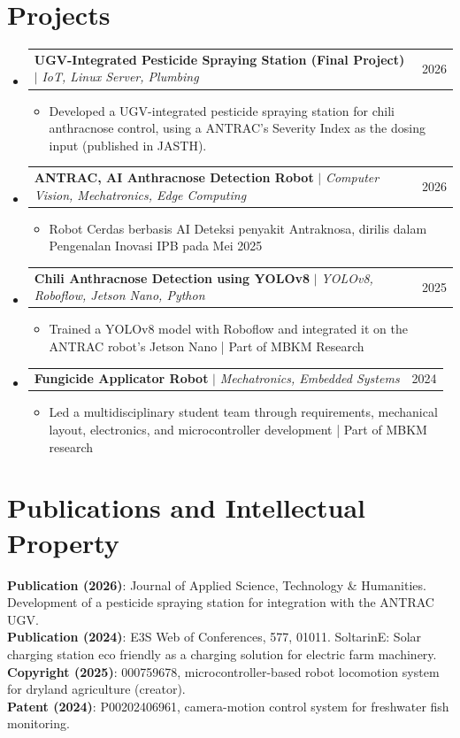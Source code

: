 \documentclass[letterpaper,11pt]{article}
\makeatletter
\newcommand{\resumeProjectHeading}[2]{
    \item
    \begin{tabular*}{0.97\textwidth}{l@{\extracolsep{\fill}}r}
      \small#1 & #2 \\
    \end{tabular*}\vspace{-7pt}
}
\newcommand{\resumeIntro}[1]{\item[]\small{#1 \vspace{-2pt}}}
\newcommand{\resumeSubHeadingListStart}{\begin{itemize}[leftmargin=0.15in, label={}]}
\newcommand{\resumeSubHeadingListEnd}{\end{itemize}}
\newcommand{\resumeItemListStart}{\begin{itemize}}
\newcommand{\resumeItemListEnd}{\end{itemize}\vspace{-5pt}}
\makeatother
\begin{document}
\section{Projects}
    \resumeSubHeadingListStart
      \resumeProjectHeading
          {\textbf{UGV-Integrated Pesticide Spraying Station (Final Project)} $|$ \emph{IoT, Linux Server, Plumbing}}{2026}
          \resumeItemListStart
            \resumeIntro{Developed a UGV-integrated pesticide spraying station for chili anthracnose control, using a ANTRAC's Severity Index as the dosing input (published in JASTH).}
          \resumeItemListEnd
      \resumeProjectHeading
          {\textbf{ANTRAC, AI Anthracnose Detection Robot} $|$ \emph{Computer Vision, Mechatronics, Edge Computing}}{2026}
          \resumeItemListStart
            \resumeIntro{Robot Cerdas berbasis AI Deteksi penyakit Antraknosa, dirilis dalam Pengenalan Inovasi IPB pada Mei 2025}
          \resumeItemListEnd
      \resumeProjectHeading
          {\textbf{Chili Anthracnose Detection using YOLOv8} $|$ \emph{YOLOv8, Roboflow, Jetson Nano, Python}}{2025}
          \resumeItemListStart
            \resumeIntro{Trained a YOLOv8 model with Roboflow and integrated it on the ANTRAC robot's Jetson Nano | Part of MBKM Research}
          \resumeItemListEnd
      \resumeProjectHeading
          {\textbf{Fungicide Applicator Robot} $|$ \emph{Mechatronics, Embedded Systems}}{2024}
          \resumeItemListStart
            \resumeIntro{Led a multidisciplinary student team through requirements, mechanical layout, electronics, and microcontroller development | Part of MBKM research}
          \resumeItemListEnd
    \resumeSubHeadingListEnd

\section{Publications and Intellectual Property}
 \begin{itemize}[leftmargin=0.15in, label={}]
    \small{\item{
     \textbf{Publication (2026)}{: Journal of Applied Science, Technology \& Humanities. Development of a pesticide spraying station for integration with the ANTRAC UGV.} \\
     \textbf{Publication (2024)}{: E3S Web of Conferences, 577, 01011. SoltarinE: Solar charging station eco friendly as a charging solution for electric farm machinery.} \\
     \textbf{Copyright (2025)}{: 000759678, microcontroller-based robot locomotion system for dryland agriculture (creator).} \\
     \textbf{Patent (2024)}{: P00202406961, camera-motion control system for freshwater fish monitoring.}
    }}
 \end{itemize}
\end{document}
